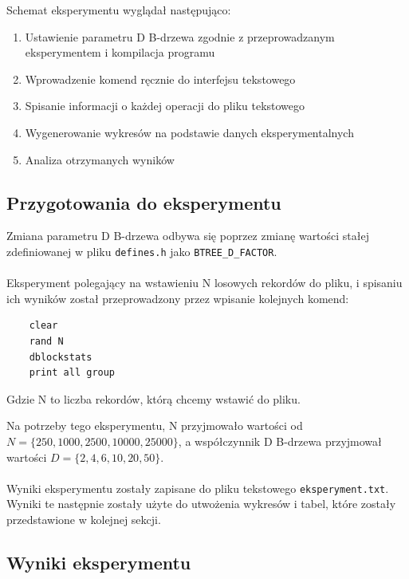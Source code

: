 \documentclass[12pt]{article}
\begin{document}
Schemat eksperymentu wyglądał następująco:

\begin{enumerate}
    \item Ustawienie parametru D B-drzewa zgodnie z przeprowadzanym eksperymentem i kompilacja programu
    \item Wprowadzenie komend ręcznie do interfejsu tekstowego
    \item Spisanie informacji o każdej operacji do pliku tekstowego
    \item Wygenerowanie wykresów na podstawie danych eksperymentalnych
    \item Analiza otrzymanych wyników
\end{enumerate}

\subsection{Przygotowania do eksperymentu}

Zmiana parametru D B-drzewa odbywa się poprzez zmianę wartości stałej zdefiniowanej w pliku \texttt{defines.h}
jako \verb!BTREE_D_FACTOR!.
\\\\
Eksperyment polegający na wstawieniu N losowych rekordów do pliku, i spisaniu ich wyników został przeprowadzony
przez wpisanie kolejnych komend:
\begin{verbatim}
    clear
    rand N
    dblockstats
    print all group
\end{verbatim}
Gdzie N to liczba rekordów, którą chcemy wstawić do pliku.

Na potrzeby tego eksperymentu, N przyjmowało wartości od \(N = \{250, 1000, 2500, 10000, 25000 \} \),
a współczynnik D B-drzewa przyjmował wartości \(D = \{2, 4, 6, 10, 20, 50 \}\).
\\\\
Wyniki eksperymentu zostały zapisane do pliku tekstowego \texttt{eksperyment.txt}.
Wyniki te następnie zostały użyte do utwożenia wykresów i tabel, które zostały przedstawione w kolejnej sekcji.

\subsection{Wyniki eksperymentu}
\end{document}
